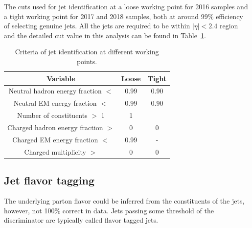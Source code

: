 The cuts used for jet identification at a loose working point for 2016 samples and a tight working point for 2017 and 2018 samples, both at around $99\%$ efficiency of selecting genuine jets.
All the jets are required to be within $|\eta|<2.4$ region and the detailed cut value in this analysis can be found in Table~\ref{tab:reco_jetid}.
\begin{table}
    \caption{Criteria of jet identification at different working points.}
    \label{tab:reco_jetid}
    \centering
    \begin{tabular}{ccc}
        \hline
        Variable & Loose & Tight\\
        \hline
        Neutral hadron energy fraction $<$ & 0.99 & 0.90\\
        Neutral EM energy fraction $<$ & 0.99 & 0.90\\
        Number of constituents $>$ 1 & 1\\
        Charged hadron energy fraction $>$ & 0 & 0\\
        Charged EM energy fraction $<$ & 0.99 & -\\ 
        Charged multiplicity $>$ & 0 & 0\\
        \hline
    \end{tabular}
\end{table}

\subsection{Jet flavor tagging}
The underlying parton flavor could be inferred from the constituents of the jets, however, not 100$\%$ correct in data.
Jets passing some threshold of the discriminator are typically called flavor tagged jets.

